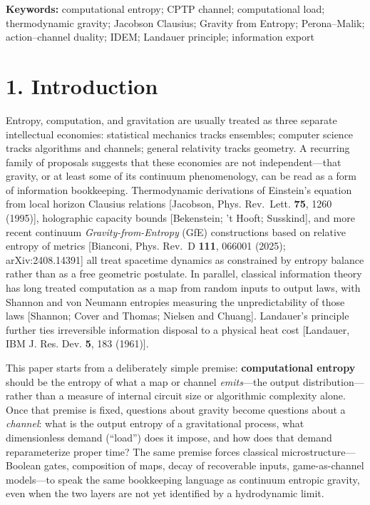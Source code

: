 \documentclass[
  11pt,
]{article}
\begin{document}
\textbf{Keywords:} computational entropy; CPTP channel; computational load; thermodynamic gravity; Jacobson Clausius; Gravity from Entropy; Perona--Malik; action--channel duality; IDEM; Landauer principle; information export

\section{1. Introduction}\label{introduction}

Entropy, computation, and gravitation are usually treated as three separate intellectual economies: statistical mechanics tracks ensembles; computer science tracks algorithms and channels; general relativity tracks geometry. A recurring family of proposals suggests that these economies are not independent---that gravity, or at least some of its continuum phenomenology, can be read as a form of information bookkeeping. Thermodynamic derivations of Einstein's equation from local horizon Clausius relations {[}Jacobson, Phys. Rev.~Lett. \textbf{75}, 1260 (1995){]}, holographic capacity bounds {[}Bekenstein; 't Hooft; Susskind{]}, and more recent continuum \emph{Gravity-from-Entropy} (GfE) constructions based on relative entropy of metrics {[}Bianconi, Phys. Rev.~D \textbf{111}, 066001 (2025); arXiv:2408.14391{]} all treat spacetime dynamics as constrained by entropy balance rather than as a free geometric postulate. In parallel, classical information theory has long treated computation as a map from random inputs to output laws, with Shannon and von Neumann entropies measuring the unpredictability of those laws {[}Shannon; Cover and Thomas; Nielsen and Chuang{]}. Landauer's principle further ties irreversible information disposal to a physical heat cost {[}Landauer, IBM J. Res. Dev. \textbf{5}, 183 (1961){]}.

This paper starts from a deliberately simple premise: \textbf{computational entropy} should be the entropy of what a map or channel \emph{emits}---the output distribution---rather than a measure of internal circuit size or algorithmic complexity alone. Once that premise is fixed, questions about gravity become questions about a \emph{channel}: what is the output entropy of a gravitational process, what dimensionless demand (``load'') does it impose, and how does that demand reparameterize proper time? The same premise forces classical microstructure---Boolean gates, composition of maps, decay of recoverable inputs, game-as-channel models---to speak the same bookkeeping language as continuum entropic gravity, even when the two layers are not yet identified by a hydrodynamic limit.
\end{document}
